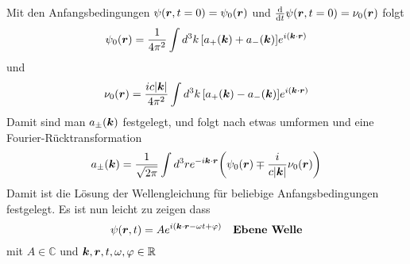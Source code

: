 Mit den Anfangsbedingungen $\psi(\vb*r, t=0)=\psi_0(\vb*r)$ und $\dv t \psi(\vb*r, t=0)=\nu_0(\vb*r)$ folgt
\begin{equation}
  \psi_0(\vb*r)
  =
  \frac{1}{4\pi^2} 
  \int d^3k \,
  \qty[a_+(\vb*k)+
  a_-(\vb*k)]e^{i(\vb*k\cdot\vb*r)}
\end{equation}
und
\begin{equation}
  \nu_0(\vb*r)
  =
  \frac{ic\abs{\vb*k}}{4\pi^2} 
  \int d^3k \,
  \qty[a_+(\vb*k)-
  a_-(\vb*k)]e^{i(\vb*k\cdot\vb*r)}
\end{equation}
Damit sind man $a_\pm(\vb*k)$ festgelegt, und folgt nach etwas umformen und
eine Fourier-Rücktransformation
\begin{equation}
  a_\pm(\vb*k) =
  \frac{1}{\sqrt{2\pi}} \int d^3r e^{-i\vb*k\cdot\vb*r}
  \qty(
  \psi_0(\vb*r) \mp \frac{i}{c\abs{\vb*k}} \nu_0(\vb*r)
  )
\end{equation}
Damit ist die Lösung der Wellengleichung für beliebige Anfangsbedingungen festgelegt. Es ist nun leicht zu zeigen dass
\begin{equation}
  \psi(\vb*r, t) = A e^{i(\vb*k\cdot\vb*r-\omega t + \varphi)}
  \quad
  \text{\textbf{Ebene Welle}}
\end{equation}
mit $A\in \mathbb{C}$ und $\vb*k, \vb*r, t, \omega, \varphi\in \mathbb{R}$

